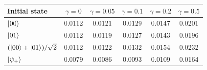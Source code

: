 \begin{tabular}{@{}lccccc@{}}
\toprule
Initial state & $\gamma=0$ & $\gamma=0.05$ & $\gamma=0.1$ & $\gamma=0.2$ & $\gamma=0.5$\\
\midrule
$\left|00\right\rangle$ & 0.0112 & 0.0121 & 0.0129 & 0.0147 & 0.0201\\
$\left|01\right\rangle$ & 0.0112 & 0.0119 & 0.0127 & 0.0143 & 0.0196\\
$(\left|00\right\rangle+\left|01\right\rangle)/\sqrt2$ & 0.0112 & 0.0122 & 0.0132 & 0.0154 & 0.0232\\
$\left|\psi_+\right\rangle$ & 0.0079 & 0.0086 & 0.0093 & 0.0109 & 0.0164\\
\bottomrule
\end{tabular}

